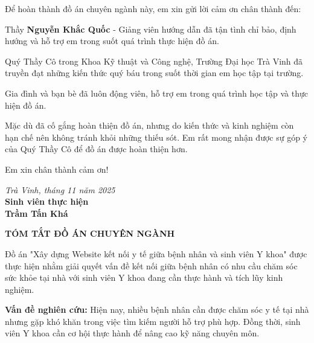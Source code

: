\documentclass[a4paper,12pt]{report}
\begin{document}
Để hoàn thành đồ án chuyên ngành này, em xin gửi lời cảm ơn chân thành đến:

Thầy \textbf{Nguyễn Khắc Quốc} - Giảng viên hướng dẫn đã tận tình chỉ bảo, định hướng và hỗ trợ em trong suốt quá trình thực hiện đồ án.

Quý Thầy Cô trong Khoa Kỹ thuật và Công nghệ, Trường Đại học Trà Vinh đã truyền đạt những kiến thức quý báu trong suốt thời gian em học tập tại trường.

Gia đình và bạn bè đã luôn động viên, hỗ trợ em trong quá trình học tập và thực hiện đồ án.

Mặc dù đã cố gắng hoàn thiện đồ án, nhưng do kiến thức và kinh nghiệm còn hạn chế nên không tránh khỏi những thiếu sót. Em rất mong nhận được sự góp ý của Quý Thầy Cô để đồ án được hoàn thiện hơn.

Em xin chân thành cảm ơn!

\begin{flushright}
\textit{Trà Vinh, tháng 11 năm 2025}\\
\textbf{Sinh viên thực hiện}\\[1cm]
\textbf{Trầm Tấn Khá}
\end{flushright}

\newpage
\tableofcontents

\newpage
\listoffigures
{}

\newpage
\listoftables
{}


\newpage
{}
\begin{center}
\textbf{\Large TÓM TẮT ĐỒ ÁN CHUYÊN NGÀNH}
\end{center}
\vspace{1cm}

Đồ án "Xây dựng Website kết nối y tế giữa bệnh nhân và sinh viên Y khoa" được thực hiện nhằm giải quyết vấn đề kết nối giữa bệnh nhân có nhu cầu chăm sóc sức khỏe tại nhà với sinh viên Y khoa đang cần thực hành và tích lũy kinh nghiệm.

\textbf{Vấn đề nghiên cứu:} Hiện nay, nhiều bệnh nhân cần được chăm sóc y tế tại nhà nhưng gặp khó khăn trong việc tìm kiếm người hỗ trợ phù hợp. Đồng thời, sinh viên Y khoa cần cơ hội thực hành để nâng cao kỹ năng chuyên môn.
\end{document}
